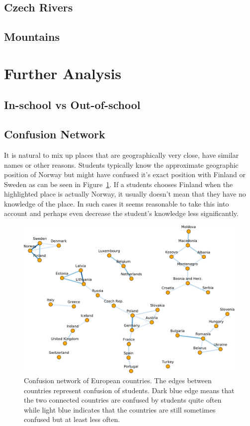 \subsection{Czech Rivers}

\subsection{Mountains}

\section{Further Analysis}
\label{further-analysis}

\subsection{In-school vs Out-of-school}

\subsection{Confusion Network}

It is natural to mix up places that are geographically very close, have similar names or other reasons. Students typically know the approximate geographic position of Norway but might have confused it's exact position with Finland or Sweden as can be seen in Figure~\ref{confusion-network}. If a students chooses Finland when the highlighted place is actually Norway, it usually doesn't mean that they have no knowledge of the place. In such cases it seems reasonable to take this into account and perhaps even decrease the student's knowledge less significantly.

\begin{figure}[htbp]
  \centering
  \includegraphics[width=\textwidth]{img/confusion-network}
  \caption{Confusion network of European countries. The edges between countries represent confusion of students. Dark blue edge means that the two connected countries are confused by students quite often while light blue indicates that the countries are still sometimes confused but at least less often.}
  \label{confusion-network}
\end{figure}
